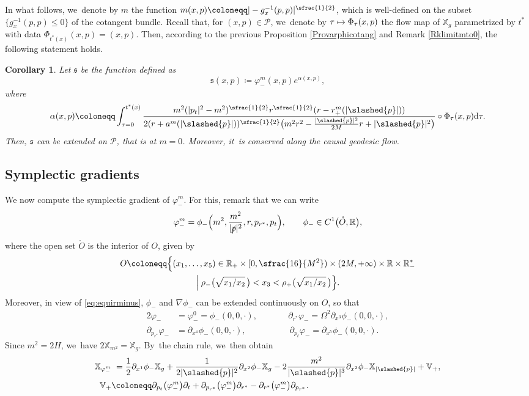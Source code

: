 \documentclass[10pt]{amsart}
\newcommand\mto{\mathchoice{\longmapsto}{\mapsto}{\mapsto}{\mapsto}}
\theoremstyle{plain}
\newtheorem{corollary}[proposition]{Corollary}
\theoremstyle{definition}
\newcommand\R{{\mathbb{R}}}
\newcommand\T{{\mathbb{X}}}
\newcommand\dr{{\mathrm{d}}}
\begin{document}
In what follows, we~denote by $m$ the function $m(x,p)\coloneqq |-g_x^{-1}(p,p)|^{\sfrac{1}{2}}$, which is well-defined on the subset $\{g_x^{-1}(p,p) \leq 0 \}$ of the cotangent bundle. Recall that, for $(x,p) \in \mathcal{P}$, we~denote by $\tau \mto \Phi_{\tau}(x,p)$ the flow map of $\T_g$ parametrized by $t^*$ with data $\Phi_{t^*(x)}(x,p)=(x,p)$. Then, according to the previous Proposition \ref{Provarphicotang} and Remark \ref{Rklimitmto0}, the following statement holds.
\begin{corollary}\label{Corvarphicotang}
Let $\mathfrak{s}$ be the function defined as
\[
\mathfrak{s}(x,p)\coloneqq \varphi_-^m (x,p) e^{\alpha (x,p)},
\]
where
\[
\alpha(x,p)\coloneqq \int_{\tau=0}^{t^*(x)} \frac{m^2(|p_t|^2-m^2)^{\sfrac{1}{2}}r^{\sfrac{1}{2}}(r-r^{m}_+(|\slashed{p}|))}{2(r+a^{m}(|\slashed{p}|))^{\sfrac{1}{2}}\bigl(m^2 r^2-\frac{|\slashed{p}|^2}{2M}r+|\slashed{p}|^2\bigr)} \circ \Phi_{\tau}(x,p) \dr \tau.
\]
Then, $\mathfrak{s}$ can be extended on $\mathcal{P}$, that is at $m=0$. Moreover, it~is conserved along the causal geodesic flow.
\end{corollary}

\subsection{Symplectic gradients}\label{Subsecsympgrad}

We now compute the symplectic gradient of $\varphi_-^m$. For this, remark that we can write
\[
\varphi_-^m = \phi_- \Bigl(m^2,\frac{m^2}{|\slashed{p}|^2}, r,p_{r^*},p_t \Bigr),\qquad \phi_- \in C^1 \bigl(\mathring{O},\R \bigr),
\]
where the open set $\mathring{O}$ is the interior of $O$, given by
\begin{multline*}
O \coloneqq \Bigl\{(x_1,\dots,x_5) \in \R_+\times[0,\sfrac{16}{M^2})\times (2M,+\infty) \times \R \times \R_-^* \\
\Bigm| \rho_- \bigl(\sqrt{x_1/x_2} \, \bigr)<x_3< \rho_+ \bigl(\sqrt{x_1/x_2} \,\bigr) \Bigr\}.
\end{multline*}
Moreover, in view of \eqref{eq:equirminus}, $\phi_-$ and $\nabla \phi_-$ can be extended continuously on $O$, so that
\begin{alignat*}{2}
\varphi_-&=\varphi_-^0= \phi_-(0,0,\cdot),\qquad && \partial_{r^*} \varphi_-= \Omega^2 \partial_{x^3}\phi_-(0,0, \cdot), \\
\partial_{p_{r^*}} \varphi_- &= \partial_{x^4}\phi_-(0,0, \cdot), \qquad && \, \partial_{p_t} \varphi_-= \partial_{x^5}\phi_-(0,0, \cdot).
\end{alignat*}
Since $m^2=2H$, we~have
$2 \T_{m^2}=\T_g$. By~the chain rule, we~then obtain
\begin{align*}
\T_{\varphi_-^m} & \hphantom{:}= \frac{1}{2}\partial_{x^1} \phi_- \T_g +\frac{1}{2|\slashed{p}|^2} \partial_{x^2} \phi_- \T_g-2\frac{m^2}{|\slashed{p}|^3}\partial_{x^2} \phi_- \T_{|\slashed{p}|}+ \mathbb{V}_+, \\
\mathbb{V}_+ & \coloneqq \partial_{p_t}\bigl(\varphi_-^m \bigr) \partial_t+ \partial_{p_{r^*}}\bigl(\varphi_-^m \bigr) \partial_{r^*}-\partial_{r^*}\bigl(\varphi_-^m \bigr) \partial_{p_{r^*}}.
\end{align*}
\end{document}
